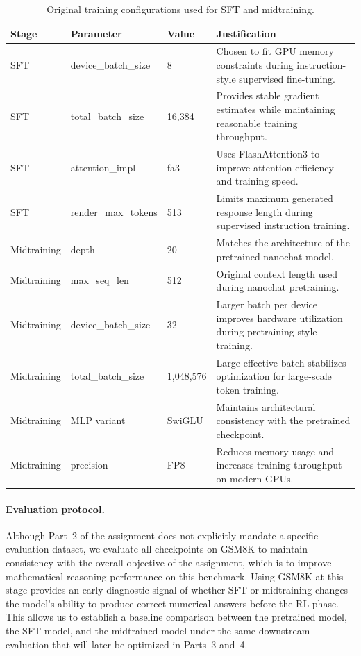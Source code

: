 \begin{table}[H]
\centering
\caption{Original training configurations used for SFT and midtraining.}
\label{tab:p2_training_configs}
\begin{tabular}{p{2cm} p{3.2cm} p{2.2cm} p{6.2cm}}
\hline
\textbf{Stage} & \textbf{Parameter} & \textbf{Value} & \textbf{Justification} \\
\hline
SFT & device\_batch\_size & 8 & Chosen to fit GPU memory constraints during instruction-style supervised fine-tuning. \\

SFT & total\_batch\_size & 16,384 & Provides stable gradient estimates while maintaining reasonable training throughput. \\

SFT & attention\_impl & fa3 & Uses FlashAttention3 to improve attention efficiency and training speed. \\

SFT & render\_max\_tokens & 513 & Limits maximum generated response length during supervised instruction training. \\

\hline
Midtraining & depth & 20 & Matches the architecture of the pretrained nanochat model. \\

Midtraining & max\_seq\_len & 512 & Original context length used during nanochat pretraining. \\

Midtraining & device\_batch\_size & 32 & Larger batch per device improves hardware utilization during pretraining-style training. \\

Midtraining & total\_batch\_size & 1,048,576 & Large effective batch stabilizes optimization for large-scale token training. \\

Midtraining & MLP variant & SwiGLU & Maintains architectural consistency with the pretrained checkpoint. \\

Midtraining & precision & FP8 & Reduces memory usage and increases training throughput on modern GPUs. \\

\hline
\end{tabular}
\end{table}

\paragraph{Evaluation protocol.}
Although Part~2 of the assignment does not explicitly mandate a specific evaluation dataset, 
we evaluate all checkpoints on GSM8K to maintain consistency with the overall objective of 
the assignment, which is to improve mathematical reasoning performance on this benchmark. 
Using GSM8K at this stage provides an early diagnostic signal of whether SFT or midtraining 
changes the model’s ability to produce correct numerical answers before the RL phase. 
This allows us to establish a baseline comparison between the pretrained model, the SFT 
model, and the midtrained model under the same downstream evaluation that will later be 
optimized in Parts~3 and~4.

